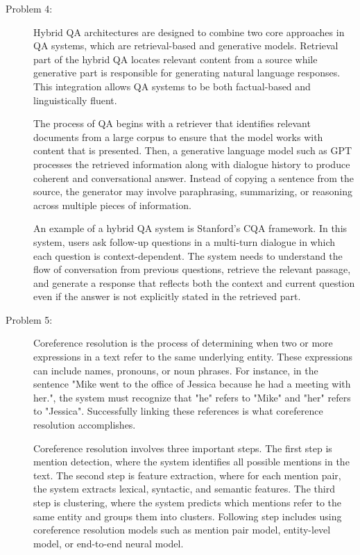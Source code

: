 \documentclass[10pt]{article}
\begin{document}
\begin{description}
\item[Problem 4:] \hfill %

Hybrid QA architectures are designed to combine two core approaches in QA systems, which are retrieval-based and generative models.
Retrieval part of the hybrid QA locates relevant content from a source while generative part is responsible for generating natural language responses.
This integration allows QA systems to be both factual-based and linguistically fluent.

The process of QA begins with a retriever that identifies relevant documents from a large corpus to ensure that the model works with content that is presented.
Then, a generative language model such as GPT processes the retrieved information along with dialogue history to produce coherent and conversational answer.
Instead of copying a sentence from the source, the generator may involve paraphrasing, summarizing, or reasoning across multiple pieces of information.

An example of a hybrid QA system is Stanford's CQA framework. In this system, users ask follow-up questions in a multi-turn dialogue in which each question is context-dependent.
The system needs to understand the flow of conversation from previous questions, retrieve the relevant passage, and generate a response that reflects both the context and current question
even if the answer is not explicitly stated in the retrieved part.

\item[Problem 5:] \hfill %

Coreference resolution is the process of determining when two or more expressions in a text refer to the same underlying entity. 
These expressions can include names, pronouns, or noun phrases. For instance, in the sentence "Mike went to the office of Jessica because he had a meeting with her.",
the system must recognize that "he" refers to "Mike" and "her" refers to "Jessica".
Successfully linking these references is what coreference resolution accomplishes.

Coreference resolution involves three important steps.
The first step is mention detection, where the system identifies all possible mentions in the text.
The second step is feature extraction, where for each mention pair, the system extracts lexical, syntactic, and semantic features.
The third step is clustering, where the system predicts which mentions refer to the same entity and groups them into clusters.
Following step includes using coreference resolution models such as mention pair model, entity-level model, or end-to-end neural model.


\end{description}
\end{document}
